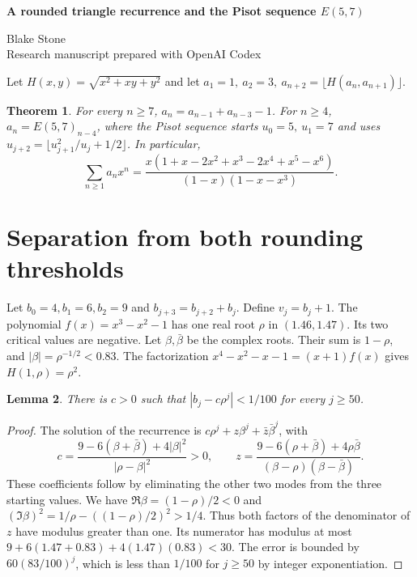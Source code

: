 \documentclass[11pt,letterpaper]{article}
\newtheorem{theorem}{Theorem}
\newtheorem{lemma}[theorem]{Lemma}
\begin{document}
\thispagestyle{plain}
\begin{center}
{\LARGE\bfseries A rounded triangle recurrence and the Pisot sequence $E(5,7)$\par}
\vspace{0.5em}
Blake Stone\\
{\small Research manuscript prepared with OpenAI Codex}
\end{center}

\begin{abstract}
The floor of the third side of a triangle with included angle \(120^\circ\) defines OEIS A128424. We prove Colin Barker's recurrence and rational generating function, and prove that its tail equals the Pisot sequence \(E(5,7)\) at every index. The two rounding rules eventually agree on a wider family of integer sequences.
\end{abstract}

Let \(H(x,y)=\sqrt{x^2+xy+y^2}\) and let \(a_1=1,\ a_2=3,\ a_{n+2}=\lfloor H(a_n,a_{n+1})\rfloor\).
\begin{theorem}\label{th:main}
For every \(n\ge7\), \(a_n=a_{n-1}+a_{n-3}-1\). For \(n\ge4\), \(a_n=E(5,7)_{n-4}\), where the Pisot sequence starts \(u_0=5,\ u_1=7\) and uses \(u_{j+2}=\lfloor u_{j+1}^2/u_j+1/2\rfloor\). In particular,
\[
 \sum_{n\ge1}a_n x^n=
 \frac{x(1+x-2x^2+x^3-2x^4+x^5-x^6)}
 {(1-x)(1-x-x^3)} .
\]
\end{theorem}

\section{Separation from both rounding thresholds}
Let \(b_0=4,b_1=6,b_2=9\) and \(b_{j+3}=b_{j+2}+b_j\). Define \(v_j=b_j+1\). The polynomial \(f(x)=x^3-x^2-1\) has one real root \(\rho\) in \((1.46,1.47)\). Its two critical values are negative. Let \(\beta,\bar\beta\) be the complex roots. Their sum is \(1-\rho\), and \(|\beta|=\rho^{-1/2}<0.83\). The factorization \(x^4-x^2-x-1=(x+1)f(x)\) gives \(H(1,\rho)=\rho^2\).

\begin{lemma}\label{lem:error}
There is \(c>0\) such that \(|b_j-c\rho^j|<1/100\) for every \(j\ge50\).
\end{lemma}
\begin{proof}
The solution of the recurrence is \(c\rho^j+z\beta^j+\bar z\bar\beta^j\), with
\[
 c=\frac{9-6(\beta+\bar\beta)+4|\beta|^2}{|\rho-\beta|^2}>0,\qquad
 z=\frac{9-6(\rho+\bar\beta)+4\rho\bar\beta}
 {(\beta-\rho)(\beta-\bar\beta)} .
\]
These coefficients follow by eliminating the other two modes from the three starting values. We have \(\Re\beta=(1-\rho)/2<0\) and
\((\Im\beta)^2=1/\rho-((1-\rho)/2)^2>1/4\).
Thus both factors of the denominator of \(z\) have modulus greater than one. Its numerator has modulus at most \(9+6(1.47+0.83)+4(1.47)(0.83)<30\). The error is bounded by \(60(83/100)^j\), which is less than \(1/100\) for \(j\ge50\) by integer exponentiation.
\end{proof}
\end{document}
